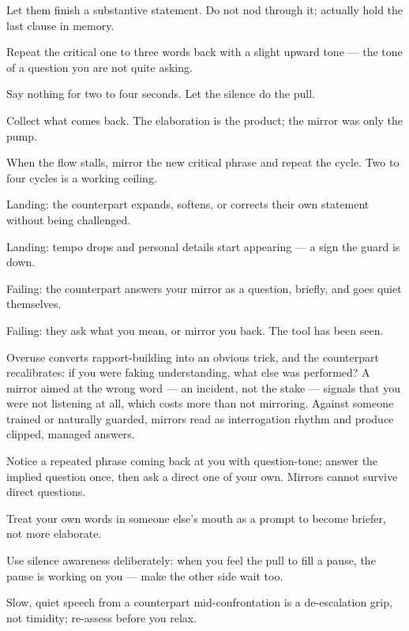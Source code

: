 \begin{application}
  \item Let them finish a substantive statement. Do not nod through it; actually hold the last clause in memory.
  \item Repeat the critical one to three words back with a slight upward tone --- the tone of a question you are not quite asking.
  \item Say nothing for two to four seconds. Let the silence do the pull.
  \item Collect what comes back. The elaboration is the product; the mirror was only the pump.
  \item When the flow stalls, mirror the new critical phrase and repeat the cycle. Two to four cycles is a working ceiling.
\end{application}
\begin{feedback}
  \item Landing: the counterpart expands, softens, or corrects their own statement without being challenged.
  \item Landing: tempo drops and personal details start appearing --- a sign the guard is down.
  \item Failing: the counterpart answers your mirror as a question, briefly, and goes quiet themselves.
  \item Failing: they ask what you mean, or mirror you back. The tool has been seen.
\end{feedback}
\begin{failure}
Overuse converts rapport-building into an obvious trick, and the counterpart recalibrates: if you were faking understanding, what else was performed? A mirror aimed at the wrong word --- an incident, not the stake --- signals that you were not listening at all, which costs more than not mirroring. Against someone trained or naturally guarded, mirrors read as interrogation rhythm and produce clipped, managed answers.
\end{failure}
\begin{countermeasures}
  \item Notice a repeated phrase coming back at you with question-tone; answer the implied question once, then ask a direct one of your own. Mirrors cannot survive direct questions.
  \item Treat your own words in someone else's mouth as a prompt to become briefer, not more elaborate.
  \item Use silence awareness deliberately: when you feel the pull to fill a pause, the pause is working on you --- make the other side wait too.
  \item Slow, quiet speech from a counterpart mid-confrontation is a de-escalation grip, not timidity; re-assess before you relax.
\end{countermeasures}

\seesources
{}
